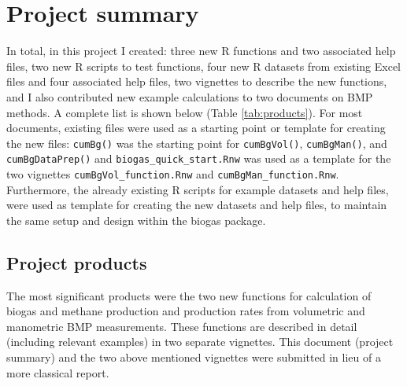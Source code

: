\documentclass{article}
\begin{document}
\section{Project summary}
In total, in this project I created: three new R functions and two associated help files, two new R scripts to test functions, four new R datasets from existing Excel files and four associated help files, two vignettes to describe the new functions, and I also contributed new example calculations to two documents on BMP methods. A complete list is shown below (Table \ref{tab:products}). For most documents, existing files were used as a starting point or template for creating the new files: \texttt{cumBg()} was the starting point for \texttt{cumBgVol()}, \texttt{cumBgMan()}, and \texttt{cumBgDataPrep()} and \texttt{biogas\_quick\_start.Rnw} was used as a template for the two vignettes \texttt{cumBgVol\_function.Rnw} and \texttt{cumBgMan\_function.Rnw}. Furthermore, the already existing R scripts for example datasets and help files, were used as template for creating the new datasets and help files, to maintain the same setup and design within the biogas package.  

\subsection{Project products}
The most significant products were the two new functions for calculation of biogas and methane production and production rates from volumetric and manometric BMP measurements. These functions are described in detail (including relevant examples) in two separate vignettes.
This document (project summary) and the two above mentioned vignettes were submitted in lieu of a more classical report. 
\end{document}
